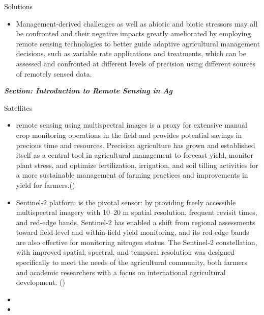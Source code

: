 \documentclass[12pt, letterpaper]{article}
\begin{document}
Solutions
\begin{itemize}
  \item Management-derived challenges as well as abiotic and biotic stressors may all be confronted and their negative impacts greatly ameliorated by employing remote sensing technologies to better guide adaptive agricultural management decisions, such as variable rate applications and treatments, which can be assessed and confronted at different levels of precision using different sources of remotely sensed data.
\end{itemize}



\large
\begin{flushleft}
\textbf{\textit{Section: Introduction to Remote Sensing in Ag}}
\end{flushleft}
\normalsize
Satellites
\begin{itemize}
  \item remote sensing using multispectral images is a proxy for extensive manual crop monitoring operations in the field and provides potential savings in precious time and resources. Precision agriculture has grown and established itself as a central tool in agricultural management to forecast yield, monitor plant stress, and optimize fertilization, irrigation, and soil tilling activities for a more sustainable management of farming practices and improvements in yield for farmers.(\textbf{\cite{segarra_remote_2020}})
  \item Sentinel-2 platform is the pivotal sensor: by providing freely accessible multispectral imagery with 10–20 m spatial resolution, frequent revisit times, and red-edge bands, Sentinel-2 has enabled a shift from regional assessments toward field-level and within-field yield monitoring, and its red-edge bands are also effective for monitoring nitrogen status. The Sentinel-2 constellation, with improved spatial, spectral, and temporal resolution was designed specifically to meet the needs of the agricultural community, both farmers and academic researchers with a focus on international agricultural development. (\textbf{\cite{segarra_remote_2020}})
  \item
  \item
\end{itemize}
\end{document}
